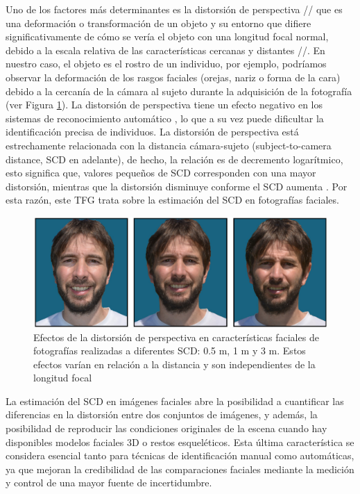 Uno de los factores más determinantes es la distorsión de perspectiva \cite{8} // que es una deformación o transformación de un objeto y su entorno que difiere significativamente de cómo se vería el objeto con una longitud focal normal, debido a la escala relativa de las características cercanas y distantes //. En nuestro caso, el objeto es el rostro de un individuo, por ejemplo, podríamos observar la deformación de los rasgos faciales (orejas, nariz o forma de la cara) debido a la cercanía de la cámara al sujeto durante la adquisición de la fotografía \cite{12} (ver Figura \ref{fig1}). La distorsión de perspectiva tiene un efecto negativo en los sistemas de reconocimiento automático \cite{9,10,11}, lo que a su vez puede dificultar la identificación precisa de individuos. La distorsión de perspectiva está estrechamente relacionada con la distancia cámara-sujeto (subject-to-camera distance, SCD en adelante), de hecho, la relación es de decremento logarítmico, esto significa que, valores pequeños de SCD corresponden con una mayor distorsión, mientras que la distorsión disminuye conforme el SCD aumenta \cite{23}. Por esta razón, este TFG trata sobre la estimación del SCD en fotografías faciales.

\begin{figure}[h]
	\centering
	\includegraphics[scale=0.25]{imagenes/cap1/facial_distortion.png}
	\caption{Efectos de la distorsión de perspectiva en características faciales de fotografías realizadas a diferentes SCD: 0.5 m, 1 m y 3 m. Estos efectos varían en relación a la distancia y son independientes de la longitud focal \cite{14}}
	\label{fig1}
\end{figure}


La estimación del SCD en imágenes faciales abre la posibilidad a cuantificar las diferencias en la distorsión entre dos conjuntos de imágenes, y además, la posibilidad de reproducir las condiciones originales de la escena cuando hay disponibles modelos faciales 3D o restos esqueléticos. Esta última característica se considera esencial tanto para técnicas de identificación manual como automáticas, ya que mejoran la credibilidad de las comparaciones faciales mediante la medición y control de una mayor fuente de incertidumbre.

